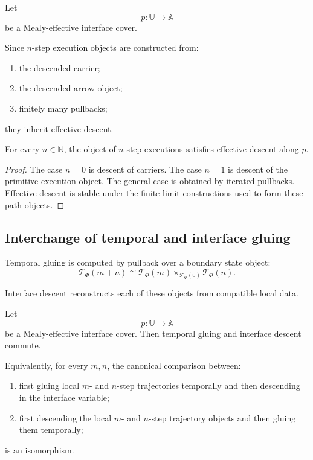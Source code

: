 Let
\[
    p:\mathbb U\to\mathbb A
\]
be a Mealy-effective interface cover.

Since \(n\)-step execution objects are constructed from:
\begin{enumerate}
    \item the descended carrier;
    \item the descended arrow object;
    \item finitely many pullbacks;
\end{enumerate}
they inherit effective descent.

\begin{proposition}
\label{prop:descent-n-step-executions}
For every \(n\in\mathbb N\), the object of \(n\)-step executions satisfies
effective descent along \(p\).
\end{proposition}

\begin{proof}
The case \(n=0\) is descent of carriers. The case \(n=1\) is descent of the
primitive execution object. The general case is obtained by iterated
pullbacks. Effective descent is stable under the finite-limit constructions
used to form these path objects.
\end{proof}

\subsection{Interchange of temporal and interface gluing}
\label{subsec:interchange-temporal-interface-gluing}

Temporal gluing is computed by pullback over a boundary state object:
\[
    \mathscr T_\Phi(m+n)
    \cong
    \mathscr T_\Phi(m)
    \times_{\mathscr T_\Phi(0)}
    \mathscr T_\Phi(n).
\]

Interface descent reconstructs each of these objects from compatible local
data.

\begin{theorem}
\label{thm:temporal-interface-interchange}
Let
\[
    p:\mathbb U\to\mathbb A
\]
be a Mealy-effective interface cover. Then temporal gluing and interface
descent commute.

Equivalently, for every \(m,n\), the canonical comparison between:
\begin{enumerate}
    \item first gluing local \(m\)- and \(n\)-step trajectories temporally and
    then descending in the interface variable;
    \item first descending the local \(m\)- and \(n\)-step trajectory objects
    and then gluing them temporally;
\end{enumerate}
is an isomorphism.
\end{theorem}


